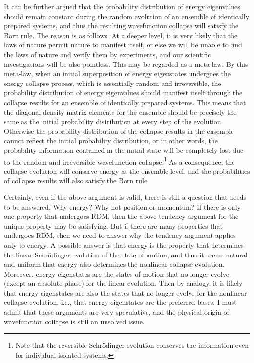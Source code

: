 It can be further argued that the probability distribution of energy eigenvalues should remain constant during the random evolution of an ensemble of identically prepared systems, and thus the resulting wavefunction collapse will satisfy the Born rule. The reason is as follows.
At a deeper level, it is very likely that the laws of nature permit nature to manifest itself, or else we will be unable to find the laws of nature and verify them by experiments, and our scientific investigations will be also pointless. This may be regarded as a meta-law. 
By this meta-law, when an initial superposition of energy eigenstates undergoes the energy collapse process, which is essentially random and irreversible, the probability distribution of energy eigenvalues should manifest itself through the collapse results for an ensemble of identically prepared systems.
This means that the diagonal density matrix elements for the ensemble should be precisely the same as the initial probability distribution at every step of the evolution. 
Otherwise the probability distribution of the collapse results in the ensemble cannot reflect the initial probability distribution, or in other words, the probability information contained in the initial state will be completely lost due to the random and irreversible wavefunction collapse.\footnote{Note that the reversible Schr\"{o}dinger evolution conserves the information even for individual isolated systems.} As a consequence, the collapse evolution will conserve energy at the ensemble level, and the probabilities of collapse results will also satisfy the Born rule.

Certainly, even if the above argument is valid, there is still a question that needs to be answered. Why energy? Why not position or momentum?
If there is only one property that undergoes RDM, then the above tendency argument for the unique property may be satisfying. But if there are many properties that undergoes RDM, then we need to answer why the tendency argument applies only to energy. A possible answer is that energy is the property that determines the linear Schr\"{o}dinger evolution of the state of motion, and thus it seems natural and uniform that energy also determines the nonlinear collapse evolution. Moreover, energy eigenstates are the states of motion that no longer evolve (except an absolute phase) for the linear evolution. Then by analogy, it is likely that energy eigenstates are also the states that no longer evolve for the nonlinear collapse evolution, i.e., that energy eigenstates are the preferred bases. I must admit that these arguments are very speculative, and the physical origin of wavefunction collapse is still an unsolved issue. 

